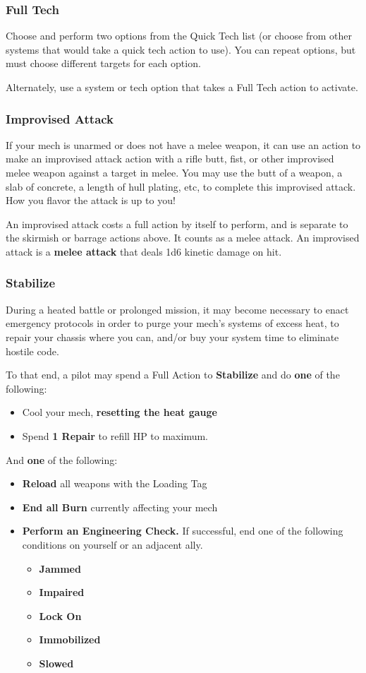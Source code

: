 \subsubsection{Full Tech}
Choose and perform two options from the Quick Tech list (or choose from other systems that would take a quick tech action to use). You can repeat options, but must choose different targets for each option.

Alternately, use a system or tech option that takes a Full Tech action to activate.

\subsubsection{Improvised Attack}

If your mech is unarmed or does not have a melee weapon, it can use an action to make an improvised attack action with a rifle butt, fist, or other improvised melee weapon against a target in melee. You may use the butt of a weapon, a slab of concrete, a length of hull plating, etc, to complete this improvised attack. How you flavor the attack is up to you!

An improvised attack costs a full action by itself to perform, and is separate to the skirmish or barrage actions above. It counts as a melee attack. An improvised attack is a \textbf{melee attack} that deals 1d6 kinetic damage on hit.

\subsubsection{Stabilize}
During a heated battle or prolonged mission, it may become necessary to enact emergency protocols in order to purge your mech's systems of excess heat, to repair your chassis where you can, and/or buy your system time to eliminate hostile code.

To that end, a pilot may spend a Full Action to \textbf{Stabilize} and do \textbf{one} of the following:
\begin{itemize}
    \item Cool your mech, \textbf{resetting the heat gauge}
    \item Spend \textbf{1 Repair} to refill HP to maximum.
\end{itemize}
And \textbf{one} of the following:
\begin{itemize}
    \item \textbf{Reload} all weapons with the Loading Tag
    \item \textbf{End all Burn} currently affecting your mech
    \item \textbf{Perform an Engineering Check.} If successful, end one of the following conditions on yourself or an adjacent ally.
    \begin{itemize}
        \item \textbf{Jammed}
        \item \textbf{Impaired}
        \item \textbf{Lock On}
        \item \textbf{Immobilized}
        \item \textbf{Slowed}
    \end{itemize}
\end{itemize}

